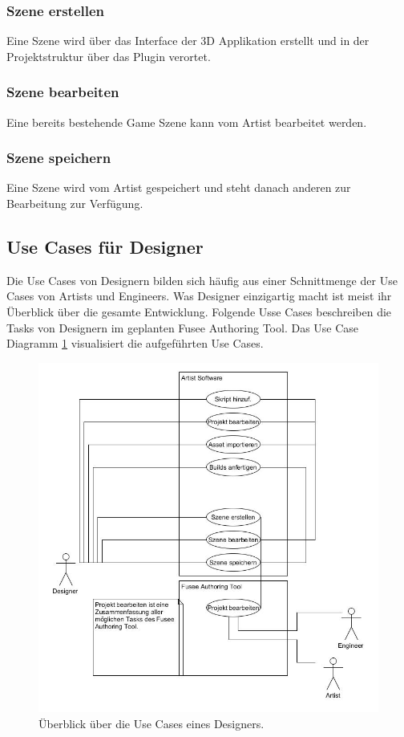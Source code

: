\documentclass[pagesize, paper=a4, fontsize=12pt, titlepage=true, headings=small, headnosepline, abstractoff, liststotoc, nochapterprefix, plainheadsepline, twoside]{scrreprt}
\begin{document}
\subsubsection{Szene erstellen}
Eine Szene wird über das Interface der 3D Applikation erstellt und in der Projektstruktur über das Plugin verortet.

\subsubsection{Szene bearbeiten}
Eine bereits bestehende Game Szene kann vom Artist bearbeitet werden.

\subsubsection{Szene speichern}
Eine Szene wird vom Artist gespeichert und steht danach anderen zur Bearbeitung zur Verfügung.

\subsection{Use Cases für Designer}
Die Use Cases von Designern bilden sich häufig aus einer Schnittmenge der Use Cases von Artists und Engineers. Was Designer einzigartig macht ist meist ihr Überblick über die gesamte Entwicklung. Folgende Usse Cases beschreiben die Tasks von Designern im geplanten Fusee Authoring Tool. Das Use Case Diagramm \ref{UseCaseDesigner} visualisiert die aufgeführten Use Cases.

\begin{figure}[ht]
	\centering
	\includegraphics[width=\linewidth - 2cm]{Bilder/UseCase_Designer.jpg}
	\caption{Überblick über die Use Cases eines Designers.}
	\label{UseCaseDesigner}
\end{figure}
\end{document}

